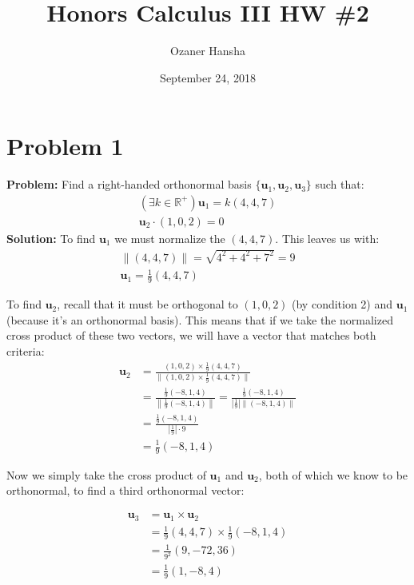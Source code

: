 \documentclass{article}
\begin{document}
\title{Honors Calculus III HW \#2}
\author{Ozaner Hansha}
\date{September 24, 2018}
\maketitle

\section{Problem 1}
\textbf{Problem:} Find a right-handed orthonormal basis $\{\mathbf{u}_1,\mathbf{u}_2,\mathbf{u}_3\}$ such that:
\begin{gather}
\left(\exists k\in\mathbb{R}^+\right)\mathbf{u}_1=k(4,4,7)\\
\mathbf{u}_2\cdot(1,0,2)=0
\end{gather}
\textbf{Solution:} To find $\mathbf{u}_1$ we must normalize the $(4,4,7)$. This leaves us with:
\begin{gather*}
\|(4,4,7)\|=\sqrt{4^2+4^2+7^2}=9\\
\mathbf{u}_1=\frac{1}{9}(4,4,7)
\end{gather*}

To find $\mathbf{u}_2$, recall that it must be orthogonal to $(1,0,2)$ (by condition 2) and $\mathbf{u}_1$ (because it's an orthonormal basis). This means that if we take the normalized cross product of these two vectors, we will have a vector that matches both criteria:
\begin{align*}
\mathbf{u}_2&=\frac{(1,0,2)\times\frac{1}{9}(4,4,7)}{\|(1,0,2)\times\frac{1}{9}(4,4,7)\|}\\
&=\frac{\frac{1}{9}(-8,1,4)}{\left\|\frac{1}{9}(-8,1,4)\right\|}=\frac{\frac{1}{9}(-8,1,4)}{\left|\frac{1}{9}\right|\left\|(-8,1,4)\right\|}\\
&=\frac{\frac{1}{9}(-8,1,4)}{\left|\frac{1}{9}\right|\cdot 9}\\
&=\frac{1}{9}(-8,1,4)
\end{align*}

Now we simply take the cross product of $\mathbf{u}_1$ and $\mathbf{u}_2$, both of which we know to be orthonormal, to find a third orthonormal vector:

\begin{align*}
\mathbf{u}_3&=\mathbf{u}_1\times\mathbf{u}_2\\
&=\frac{1}{9}(4,4,7)\times\frac{1}{9}(-8,1,4)\\
&=\frac{1}{9^2}(9,-72,36)\\
&=\frac{1}{9}(1,-8,4)
\end{align*}
\end{document}
